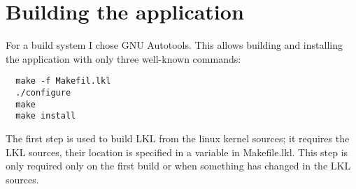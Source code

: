 \chapter{Building the application}


For a build system I chose GNU Autotools. This allows building
and installing the application with only three well-known commands:

\lstset{language=bash,caption=Build System,label=lst:building}
\begin{lstlisting}
  make -f Makefil.lkl
  ./configure
  make
  make install
\end{lstlisting}

The first step is used to build LKL from the linux kernel sources; it
requires the LKL sources, their location is specified in a variable in
Makefile.lkl. This step is only required only on the first build or
when something has changed in the LKL sources.

